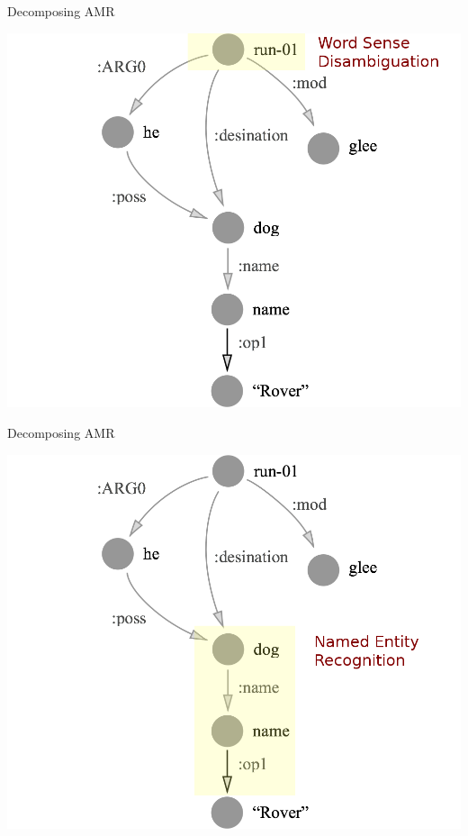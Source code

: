 \documentclass[hyperref]{beamer}
\begin{document}
\begin{frame}[noframenumbering]{Decomposing AMR}
\begin{center}
\includegraphics[scale=0.25]{glee_wsd.png}
\end{center}
\end{frame}

\begin{frame}[noframenumbering]{Decomposing AMR}
\begin{center}
\includegraphics[scale=0.25]{glee_ner.png}
\end{center}
\end{frame}
\end{document}
